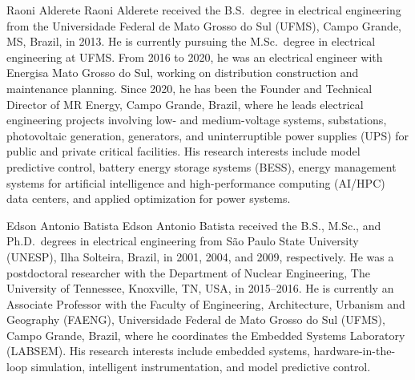 \documentclass{ieeeaccess}
\newcounter{biography}
\begin{document}
\begin{IEEEbiographynophoto}{Raoni Alderete}
Raoni Alderete received the B.S.\ degree in electrical engineering from the Universidade Federal de Mato Grosso do Sul (UFMS), Campo Grande, MS, Brazil, in 2013. He is currently pursuing the M.Sc.\ degree in electrical engineering at UFMS. From 2016 to 2020, he was an electrical engineer with Energisa Mato Grosso do Sul, working on distribution construction and maintenance planning. Since 2020, he has been the Founder and Technical Director of MR Energy, Campo Grande, Brazil, where he leads electrical engineering projects involving low- and medium-voltage systems, substations, photovoltaic generation, generators, and uninterruptible power supplies (UPS) for public and private critical facilities. His research interests include model predictive control, battery energy storage systems (BESS), energy management systems for artificial intelligence and high-performance computing (AI/HPC) data centers, and applied optimization for power systems.
\end{IEEEbiographynophoto}

\begin{IEEEbiographynophoto}{Edson Antonio Batista}
Edson Antonio Batista received the B.S., M.Sc., and Ph.D.\ degrees in electrical engineering from S\~{a}o Paulo State University (UNESP), Ilha Solteira, Brazil, in 2001, 2004, and 2009, respectively. He was a postdoctoral researcher with the Department of Nuclear Engineering, The University of Tennessee, Knoxville, TN, USA, in 2015--2016. He is currently an Associate Professor with the Faculty of Engineering, Architecture, Urbanism and Geography (FAENG), Universidade Federal de Mato Grosso do Sul (UFMS), Campo Grande, Brazil, where he coordinates the Embedded Systems Laboratory (LABSEM). His research interests include embedded systems, hardware-in-the-loop simulation, intelligent instrumentation, and model predictive control.
\end{IEEEbiographynophoto}

\EOD
\end{document}
